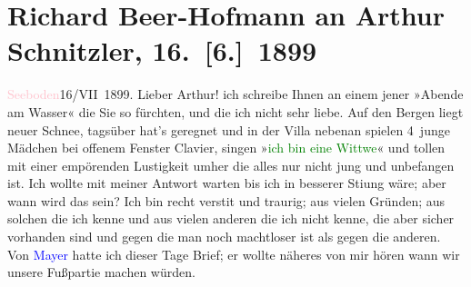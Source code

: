 

               \section[Richard Beer-Hofmann an Arthur Schnitzler, 16. {[}6.{]} 1899]{ Richard Beer-Hofmann an Arthur Schnitzler,
               16. {[}6.{]} 1899}\nopagebreak{}\rehead{ }\normalsize\beginnumbering{} \toendnotes[C]{\smallbreak\pagebreak[2]} 
\toendnotes[C]{\smallbreak}\pstart
           \raggedleft{}{\pb}\textcolor{pink}{Seeboden}{}\ledrightnote{\textcolor{pink}{Seeboden}}{ }16/VII 1899.\pend
           \pstart
           Lieber Arthur! ich schreibe Ihnen an einem jener »Abende am Wasser«
               die Sie so fürchten, und die ich nicht sehr liebe. Auf den Bergen liegt neuer Schnee,
               tagsüber hat’s geregnet und in der Villa nebenan spielen 4 junge Mäd{\pb}chen bei offenem Fenster Clavier,
               singen »\textcolor{green}{ich bin eine Wittwe}{}\ledrightnote{\textcolor{green}{Die kleine Witwe}}« und tollen mit einer
               empörenden Lustigkeit umher die alles nur nicht jung und unbefangen ist.\pend
           \pstart
           Ich wollte mit meiner Antwort warten bis ich in besserer Sti{\geminationm}ung wäre; aber wann {\pb}wird das sein? Ich bin recht
                  versti{\geminationm}t und traurig; aus vielen Gründen; aus solchen
                   die ich kenne und aus vielen anderen die ich
               nicht kenne, die aber sicher vorhanden sind und gegen die man noch machtloser {\pb}ist als gegen die anderen. Von \textcolor{blue}{Mayer}{}\ledrightnote{\textcolor{blue}{Oskar Mayer}} hatte ich dieser Tage Brief; er wollte
               näheres von mir hören wann wir unsere Fußpartie machen würden.\pend
